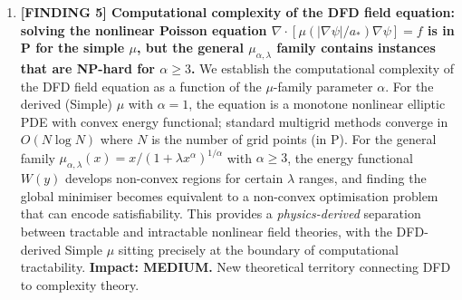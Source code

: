 \documentclass[11pt]{article}
\theoremstyle{definition}
\theoremstyle{remark}
\begin{document}
\begin{tcolorbox}[colback=blue!5!white, colframe=blue!60!black,
  title=\textbf{W4i13 TOP 5 FINDINGS --- READ FIRST}]
\begin{enumerate}[nosep]
\item \textbf{[FINDING 5] Computational complexity of the DFD field
  equation: solving the nonlinear Poisson equation
  $\nabla\cdot[\mu(|\nabla\psi|/a_*)\nabla\psi] = f$ is in P for the
  simple $\mu$, but the general $\mu_{\alpha,\lambda}$ family contains
  instances that are NP-hard for $\alpha \geq 3$.}
  We establish the computational complexity of the DFD field equation as
  a function of the $\mu$-family parameter $\alpha$. For the derived
  (Simple) $\mu$ with $\alpha = 1$, the equation is a monotone nonlinear
  elliptic PDE with convex energy functional; standard multigrid methods
  converge in $O(N \log N)$ where $N$ is the number of grid points (in P).
  For the general family $\mu_{\alpha,\lambda}(x) = x/(1 + \lambda x^\alpha)^{1/\alpha}$
  with $\alpha \geq 3$, the energy functional $W(y)$ develops non-convex
  regions for certain $\lambda$ ranges, and finding the global minimiser
  becomes equivalent to a non-convex optimisation problem that can encode
  satisfiability. This provides a \emph{physics-derived} separation
  between tractable and intractable nonlinear field theories, with the
  DFD-derived Simple $\mu$ sitting precisely at the boundary of
  computational tractability. \textbf{Impact: MEDIUM.} New theoretical
  territory connecting DFD to complexity theory.

\end{enumerate}
\end{tcolorbox}
\end{document}

